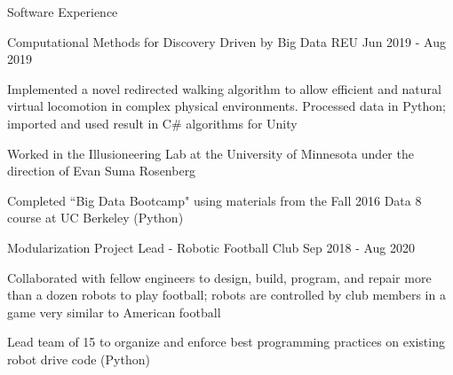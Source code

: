 \documentclass[10pt]{resume} %
\begin{document}
\begin{rSection}{ Software Experience }
\begin{rSubsection}{ Computational Methods for Discovery Driven by Big Data REU }{ Jun 2019 - Aug 2019 }{}{}
\item Implemented a novel redirected walking algorithm to allow efficient and natural virtual locomotion in complex physical environments. Processed data in Python; imported and used result in C\# algorithms for Unity
\item Worked in the Illusioneering Lab at the University of Minnesota under the direction of Evan Suma Rosenberg
\item Completed ``Big Data Bootcamp" using materials from the Fall 2016 Data 8 course at UC Berkeley (Python)
\end{rSubsection}


\begin{rSubsection}{ Modularization Project Lead - Robotic Football Club }{ Sep 2018 - Aug 2020 }{}{}
\item Collaborated with fellow engineers to design, build, program, and repair more than a dozen robots to play football; robots are controlled by club members in a game very similar to American football
\item Lead team of 15 to organize and enforce best programming practices on existing robot drive code (Python)
\end{rSubsection}

\end{rSection}

\end{document}
